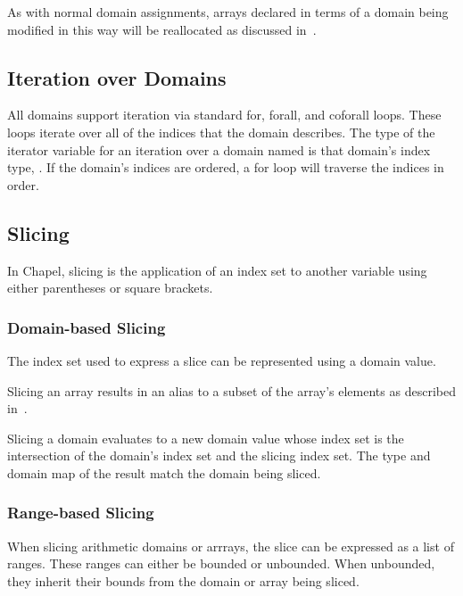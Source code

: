 As with normal domain assignments, arrays declared in terms of a
domain being modified in this way will be reallocated as discussed
in~.



\subsection{Iteration over Domains}
\label{Iteration_over_Domains}

All domains support iteration via standard for, forall, and coforall
loops.  These loops iterate over all of the indices that the domain
describes.  The type of the iterator variable for an iteration over a
domain named  is that domain's index type, .
If the domain's indices are ordered, a for loop will traverse the
indices in order.


\subsection{Slicing}
\label{Slicing}

In Chapel, slicing is the application of an index set to another
variable using either parentheses or square brackets.


\subsubsection{Domain-based Slicing}

The index set used to express a slice can be represented using a
domain value.

Slicing an array results in an alias to a subset of the array's
elements as described in~.

Slicing a domain evaluates to a new domain value whose index set is
the intersection of the domain's index set and the slicing index set.
The type and domain map of the result match the domain being sliced.

%
%

\subsubsection{Range-based Slicing}
\label{Range_Based_Slicing}
When slicing arithmetic domains or arrrays, the slice can be expressed
as a list of  ranges.  These ranges can either be bounded
or unbounded.  When unbounded, they inherit their bounds from the
domain or array being sliced.


